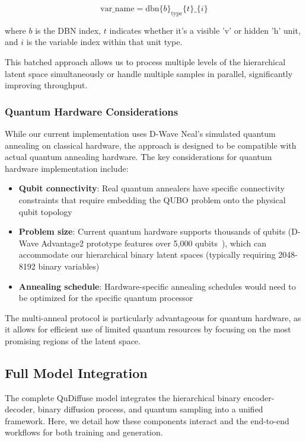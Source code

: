 \documentclass[10pt,twocolumn,letterpaper]{article}
\begin{document}
\begin{equation}
\text{var\_name} = \text{dbn}\{b\}_\text{type}\{t\}\_\{i\}
\end{equation}

where $b$ is the DBN index, $t$ indicates whether it's a visible 'v' or hidden 'h' unit, and $i$ is the variable index within that unit type.

This batched approach allows us to process multiple levels of the hierarchical latent space simultaneously or handle multiple samples in parallel, significantly improving throughput.

\subsubsection{Quantum Hardware Considerations}

While our current implementation uses D-Wave Neal's simulated quantum annealing on classical hardware, the approach is designed to be compatible with actual quantum annealing hardware. The key considerations for quantum hardware implementation include:

\begin{itemize}
    \item \textbf{Qubit connectivity}: Real quantum annealers have specific connectivity constraints that require embedding the QUBO problem onto the physical qubit topology
    \item \textbf{Problem size}: Current quantum hardware supports thousands of qubits (D-Wave Advantage2 prototype features over 5,000 qubits~\cite{dwave2025beyond}), which can accommodate our hierarchical binary latent spaces (typically requiring 2048-8192 binary variables)
    \item \textbf{Annealing schedule}: Hardware-specific annealing schedules would need to be optimized for the specific quantum processor
\end{itemize}

The multi-anneal protocol is particularly advantageous for quantum hardware, as it allows for efficient use of limited quantum resources by focusing on the most promising regions of the latent space.

\subsection{Full Model Integration}
\label{sec:integration}

The complete QuDiffuse model integrates the hierarchical binary encoder-decoder, binary diffusion process, and quantum sampling into a unified framework. Here, we detail how these components interact and the end-to-end workflows for both training and generation.
\end{document}
